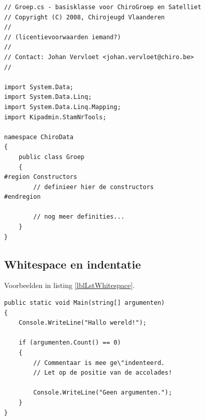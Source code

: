 \documentclass[a4paper,11pt]{article}
\begin{document}
\begin{lstlisting}[float, caption=Opbouw, texcl=false, label=lblLstOpbouw]
// Groep.cs - basisklasse voor ChiroGroep en Satelliet
// Copyright (C) 2008, Chirojeugd Vlaanderen
//
// (licentievoorwaarden iemand?)
//
// Contact: Johan Vervloet <johan.vervloet@chiro.be>
//

import System.Data;
import System.Data.Linq;
import System.Data.Linq.Mapping;
import Kipadmin.StamNrTools; 

namespace ChiroData
{
	public class Groep
	{
#region Constructors
		// definieer hier de constructors
#endregion

		// nog meer definities...
	}
}
\end{lstlisting}

\subsection{Whitespace en indentatie}

Voorbeelden in listing \ref{lblLstWhitespace}.


\begin{lstlisting}[float, caption=Indentatie, label=lblLstWhitespace]
public static void Main(string[] argumenten)
{
	Console.WriteLine("Hallo wereld!");

	if (argumenten.Count() == 0)
	{
		// Commentaar is mee ge\"indenteerd.
		// Let op de positie van de accolades!

		Console.WriteLine("Geen argumenten.");
	}
}	
\end{lstlisting}
\end{document}
